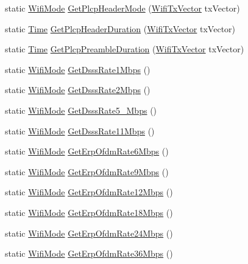 \begin{DoxyCompactItemize}
static \hyperlink{classns3_1_1WifiMode}{Wifi\+Mode} \hyperlink{classns3_1_1WifiPhy_ac6b531ab3bc66265bd2eb8b627ff60f7}{Get\+Plcp\+Header\+Mode} (\hyperlink{classns3_1_1WifiTxVector}{Wifi\+Tx\+Vector} tx\+Vector)
\item 
static \hyperlink{classns3_1_1Time}{Time} \hyperlink{classns3_1_1WifiPhy_a0f9cfd8f26cb52a1e205391064ceb6ea}{Get\+Plcp\+Header\+Duration} (\hyperlink{classns3_1_1WifiTxVector}{Wifi\+Tx\+Vector} tx\+Vector)
\item 
static \hyperlink{classns3_1_1Time}{Time} \hyperlink{classns3_1_1WifiPhy_a46ecb9d93cc8b2085b70f3e0776cbd6f}{Get\+Plcp\+Preamble\+Duration} (\hyperlink{classns3_1_1WifiTxVector}{Wifi\+Tx\+Vector} tx\+Vector)
\item 
static \hyperlink{classns3_1_1WifiMode}{Wifi\+Mode} \hyperlink{classns3_1_1WifiPhy_a8b52ed5ee9801adab6d11b8e4dc4240f}{Get\+Dsss\+Rate1\+Mbps} ()
\item 
static \hyperlink{classns3_1_1WifiMode}{Wifi\+Mode} \hyperlink{classns3_1_1WifiPhy_a6619a232c9506d049781aae17795b57f}{Get\+Dsss\+Rate2\+Mbps} ()
\item 
static \hyperlink{classns3_1_1WifiMode}{Wifi\+Mode} \hyperlink{classns3_1_1WifiPhy_aa9a581243e49199f63f9e26ef4c4ed95}{Get\+Dsss\+Rate5\+\_\+Mbps} ()
\item 
static \hyperlink{classns3_1_1WifiMode}{Wifi\+Mode} \hyperlink{classns3_1_1WifiPhy_ab959b0aa063cda3f93a9a2861526a3e2}{Get\+Dsss\+Rate11\+Mbps} ()
\item 
static \hyperlink{classns3_1_1WifiMode}{Wifi\+Mode} \hyperlink{classns3_1_1WifiPhy_a334689e428371b3383e9001cbd05deba}{Get\+Erp\+Ofdm\+Rate6\+Mbps} ()
\item 
static \hyperlink{classns3_1_1WifiMode}{Wifi\+Mode} \hyperlink{classns3_1_1WifiPhy_af2fc1ee36fc803b89575cd682138495f}{Get\+Erp\+Ofdm\+Rate9\+Mbps} ()
\item 
static \hyperlink{classns3_1_1WifiMode}{Wifi\+Mode} \hyperlink{classns3_1_1WifiPhy_aa6f7f9ca17a9451966da679415996136}{Get\+Erp\+Ofdm\+Rate12\+Mbps} ()
\item 
static \hyperlink{classns3_1_1WifiMode}{Wifi\+Mode} \hyperlink{classns3_1_1WifiPhy_ae24bbedd9df795ac630568606a579be0}{Get\+Erp\+Ofdm\+Rate18\+Mbps} ()
\item 
static \hyperlink{classns3_1_1WifiMode}{Wifi\+Mode} \hyperlink{classns3_1_1WifiPhy_a8e34487962a2e6ecbedebe5b2e883ca7}{Get\+Erp\+Ofdm\+Rate24\+Mbps} ()
\item 
static \hyperlink{classns3_1_1WifiMode}{Wifi\+Mode} \hyperlink{classns3_1_1WifiPhy_acc3956aa9fc49c16c05dc76bae0d4ad9}{Get\+Erp\+Ofdm\+Rate36\+Mbps} ()

\end{DoxyCompactItemize}
